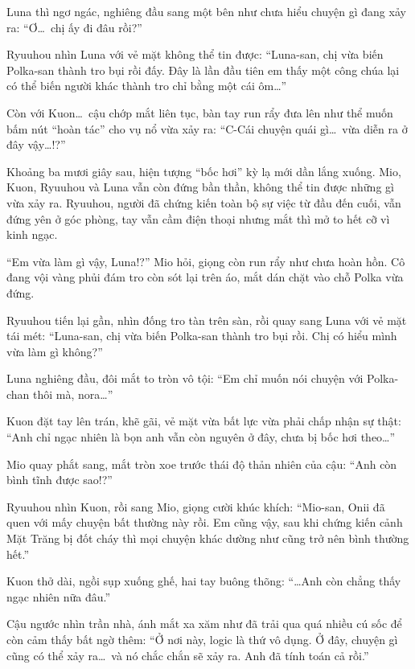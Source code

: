 \documentclass[../main.tex]{subfiles}
\begin{document}
Luna thì ngơ ngác, nghiêng đầu sang một bên như chưa hiểu chuyện gì đang xảy ra: ``Ơ\dots\ chị ấy đi đâu rồi?''

Ryuuhou nhìn Luna với vẻ mặt không thể tin được: ``Luna-san, chị vừa biến Polka-san thành tro bụi rồi đấy. Đây là lần đầu tiên em thấy một công chúa lại có thể biến người khác thành tro chỉ bằng một cái ôm\dots''

Còn với Kuon\dots\ cậu chớp mắt liên tục, bàn tay run rẩy đưa lên như thể muốn bấm nút ``hoàn tác'' cho vụ nổ vừa xảy ra: ``C-Cái chuyện quái gì\dots\ vừa diễn ra ở đây vậy\dots!?''
\omk

Khoảng ba mươi giây sau, hiện tượng ``bốc hơi'' kỳ lạ mới dần lắng xuống. Mio, Kuon, Ryuuhou và Luna vẫn còn đứng bần thần, không thể tin được những gì vừa xảy ra. Ryuuhou, người đã chứng kiến toàn bộ sự việc từ đầu đến cuối, vẫn đứng yên ở góc phòng, tay vẫn cầm điện thoại nhưng mắt thì mở to hết cỡ vì kinh ngạc.

``Em vừa làm gì vậy, Luna!?'' Mio hỏi, giọng còn run rẩy như chưa hoàn hồn. Cô đang vội vàng phủi đám tro còn sót lại trên áo, mắt dán chặt vào chỗ Polka vừa đứng.

Ryuuhou tiến lại gần, nhìn đống tro tàn trên sàn, rồi quay sang Luna với vẻ mặt tái mét: ``Luna-san, chị vừa biến Polka-san thành tro bụi rồi. Chị có hiểu mình vừa làm gì không?''

Luna nghiêng đầu, đôi mắt to tròn vô tội: ``Em chỉ muốn nói chuyện với Polka-chan thôi mà, nora\dots''

Kuon đặt tay lên trán, khẽ gãi, vẻ mặt vừa bất lực vừa phải chấp nhận sự thật: ``Anh chỉ ngạc nhiên là bọn anh vẫn còn nguyên ở đây, chưa bị bốc hơi theo\dots''

Mio quay phắt sang, mắt tròn xoe trước thái độ thản nhiên của cậu: ``Anh còn bình tĩnh được sao!?''

Ryuuhou nhìn Kuon, rồi sang Mio, giọng cười khúc khích: ``Mio-san, Onii đã quen với mấy chuyện bất thường này rồi. Em cũng vậy, sau khi chứng kiến cảnh Mặt Trăng bị đốt cháy thì mọi chuyện khác dường như cũng trở nên bình thường hết.''

Kuon thở dài, ngồi sụp xuống ghế, hai tay buông thõng: ``\dots Anh còn chẳng thấy ngạc nhiên nữa đâu.''

Cậu ngước nhìn trần nhà, ánh mắt xa xăm như đã trải qua quá nhiều cú sốc để còn cảm thấy bất ngờ thêm: ``Ở nơi này, logic là thứ vô dụng. Ở đây, chuyện gì cũng có thể xảy ra\dots\ và nó chắc chắn sẽ xảy ra. Anh đã tính toán cả rồi.''
\end{document}
